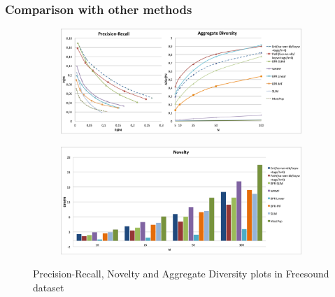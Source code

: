 \subsubsection{Comparison with other methods}\label{comp}
\begin{figure}
	\centering
	\begin{subfigure}[b]{\textwidth}
		\includegraphics[width=\textwidth]{ch07_graph-rec_pics/pr_adiv_fr.png}
	\end{subfigure}
	\begin{subfigure}[b]{\textwidth}
		\includegraphics[width=\textwidth]{ch07_graph-rec_pics/nov_fr.png}
	\end{subfigure}
	\caption{Precision-Recall, Novelty and Aggregate Diversity plots in Freesound dataset\label{fig:graph-rec:accur}}
\end{figure}
